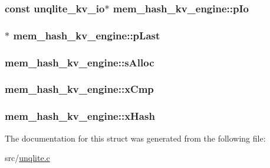 \hypertarget{structmem__hash__kv__engine_ace5f5b6ced7a99d5cfa5dc84eb34b93f}{
\subsubsection[{p\-Io}]{\setlength{\rightskip}{0pt plus 5cm}const {\bf unqlite\-\_\-kv\-\_\-io}$\ast$ mem\-\_\-hash\-\_\-kv\-\_\-engine\-::p\-Io}}\label{dc/d59/structmem__hash__kv__engine_ace5f5b6ced7a99d5cfa5dc84eb34b93f}
\hypertarget{structmem__hash__kv__engine_aba01d0c9f47c67a70433e4d9d0f1ae51}{
\subsubsection[{p\-Last}]{$\ast$ mem\-\_\-hash\-\_\-kv\-\_\-engine\-::p\-Last}}\label{dc/d59/structmem__hash__kv__engine_aba01d0c9f47c67a70433e4d9d0f1ae51}
\hypertarget{structmem__hash__kv__engine_af842fb8c42194246cf28c324b5c5a307}{
\subsubsection[{s\-Alloc}]{ mem\-\_\-hash\-\_\-kv\-\_\-engine\-::s\-Alloc}}\label{dc/d59/structmem__hash__kv__engine_af842fb8c42194246cf28c324b5c5a307}
\hypertarget{structmem__hash__kv__engine_a5c1a88bcf6aacfdd9bc59b71223f2b2c}{
\subsubsection[{x\-Cmp}]{ mem\-\_\-hash\-\_\-kv\-\_\-engine\-::x\-Cmp}}\label{dc/d59/structmem__hash__kv__engine_a5c1a88bcf6aacfdd9bc59b71223f2b2c}
\hypertarget{structmem__hash__kv__engine_a2ee33282995ee7fd7541e07f968aae0b}{
\subsubsection[{x\-Hash}]{ mem\-\_\-hash\-\_\-kv\-\_\-engine\-::x\-Hash}}\label{dc/d59/structmem__hash__kv__engine_a2ee33282995ee7fd7541e07f968aae0b}


The documentation for this struct was generated from the following file\-:\begin{DoxyCompactItemize}
\item 
src/\hyperlink{unqlite_8c}{unqlite.\-c}\end{DoxyCompactItemize}
